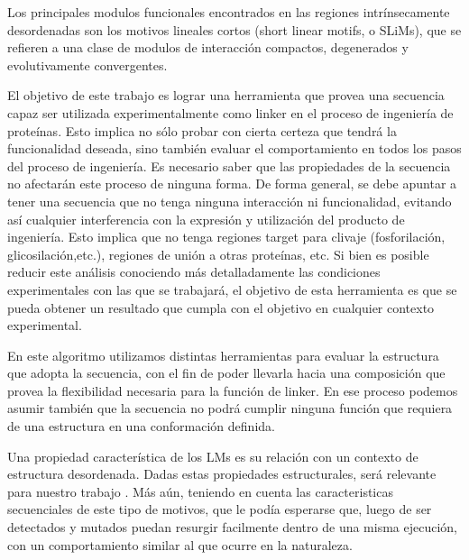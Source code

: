 
Los principales modulos funcionales encontrados en las regiones intrínsecamente desordenadas son los motivos lineales cortos (short linear motifs, o SLiMs), que se refieren a una clase de modulos de interacción compactos, 
degenerados y evolutivamente convergentes.

El objetivo de este trabajo es lograr una herramienta que provea una secuencia capaz ser utilizada experimentalmente como linker en el proceso de ingeniería de proteínas. 
Esto implica no sólo probar con cierta certeza que tendrá la funcionalidad deseada, sino también evaluar el comportamiento en todos los pasos del proceso de ingeniería. 
Es necesario saber que las propiedades de la secuencia no afectarán este proceso de ninguna forma.
De forma general, se debe apuntar a tener una secuencia que no tenga ninguna interacción ni funcionalidad, evitando así cualquier interferencia con la expresión y utilización del producto 
de ingeniería. Esto implica que no tenga regiones target para clivaje (fosforilación, glicosilación,etc.), regiones de unión a otras proteínas, etc.
Si bien es posible reducir este análisis conociendo más detalladamente las condiciones experimentales con las que se trabajará, el objetivo de esta herramienta es que se pueda obtener 
un resultado que cumpla con el objetivo en cualquier contexto experimental. 

En este algoritmo utilizamos distintas herramientas para evaluar la estructura que adopta la secuencia, con el fin de poder llevarla hacia una composición que provea la flexibilidad
necesaria para la función de linker. En ese proceso podemos asumir también que la secuencia no podrá cumplir ninguna función que requiera de una estructura en una conformación definida.

Una propiedad característica de los LMs es su relación con un contexto de estructura desordenada\cite{fuxreiter2007local}.
Dadas estas propiedades estructurales, será relevante para nuestro trabajo . Más aún, teniendo en cuenta las caracteristicas secuenciales de este tipo de motivos, que le 
podía esperarse que, luego de ser detectados y mutados puedan resurgir facilmente dentro de una misma ejecución, con un comportamiento similar al que ocurre en la naturaleza.





